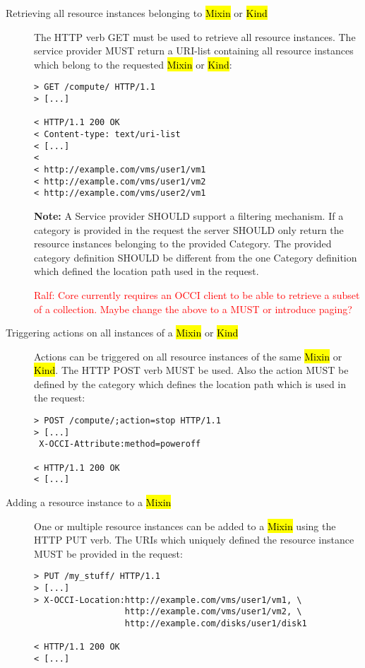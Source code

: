 \documentclass[10pt,a4paper]{article}
\newcommand{\ralf}[1]{\textcolor{red}{Ralf: #1}}
\begin{document}
\begin{description}
\item[Retrieving all resource instances belonging to \hl{Mixin} or
  \hl{Kind}] The HTTP verb GET must be used to retrieve all resource
  instances. The service provider MUST return a URI-list containing
  all resource instances which belong to the requested \hl{Mixin} or
  \hl{Kind}:
\begin{verbatim}
> GET /compute/ HTTP/1.1
> [...]
 
< HTTP/1.1 200 OK
< Content-type: text/uri-list
< [...]
< 
< http://example.com/vms/user1/vm1
< http://example.com/vms/user1/vm2
< http://example.com/vms/user2/vm1
\end{verbatim}
\textbf{Note:} A Service provider SHOULD support a filtering
mechanism. If a category is provided in the request the server SHOULD
only return the resource instances belonging to the provided
Category. The provided category definition SHOULD be different from
the one Category definition which defined the location path used in
the request.

\ralf{Core currently requires an OCCI client to be able to retrieve a subset of
a collection.  Maybe change the above to a MUST or introduce paging?}

\item[Triggering actions on all instances of a \hl{Mixin} or
  \hl{Kind}] Actions can be triggered on all resource instances of the
  same \hl{Mixin} or \hl{Kind}. The HTTP POST verb MUST be used. Also
  the action MUST be defined by the category which defines the
  location path which is used in the request:
\begin{verbatim}
> POST /compute/;action=stop HTTP/1.1
> [...]
 X-OCCI-Attribute:method=poweroff

< HTTP/1.1 200 OK
< [...]
\end{verbatim}

\item[Adding a resource instance to a \hl{Mixin}] One or multiple
  resource instances can be added to a \hl{Mixin} using the HTTP PUT
  verb. The URIs which uniquely defined the resource instance MUST be
  provided in the request:
\begin{verbatim}
> PUT /my_stuff/ HTTP/1.1
> [...]
> X-OCCI-Location:http://example.com/vms/user1/vm1, \
                  http://example.com/vms/user1/vm2, \
                  http://example.com/disks/user1/disk1

< HTTP/1.1 200 OK
< [...]
\end{verbatim}


\end{description}
\end{document}
